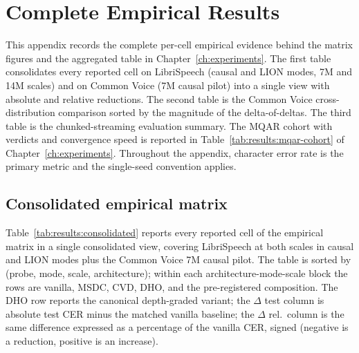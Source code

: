 \chapter{Complete Empirical Results}\label{app:results}

This appendix records the complete per-cell empirical evidence
behind the matrix figures and the aggregated table in
Chapter~\ref{ch:experiments}. The first table consolidates every
reported cell on LibriSpeech (causal and LION modes, 7M and 14M
scales) and on Common Voice (7M causal pilot) into a single view
with absolute and relative reductions. The second table is the
Common Voice cross-distribution comparison sorted by the
magnitude of the delta-of-deltas. The third table is the
chunked-streaming evaluation summary. The MQAR cohort with
verdicts and convergence speed is reported in
Table~\ref{tab:results:mqar-cohort} of
Chapter~\ref{ch:experiments}. Throughout the appendix, character
error rate is the primary metric and the single-seed convention
applies.

\section{Consolidated empirical matrix}\label{app:results:master}

Table~\ref{tab:results:consolidated} reports every reported cell
of the empirical matrix in a single consolidated view, covering
LibriSpeech at both scales in causal and LION modes plus the
Common Voice 7M causal pilot. The table is sorted by
(probe, mode, scale, architecture); within each
architecture-mode-scale block the rows are vanilla, MSDC, CVD,
DHO, and the pre-registered composition. The DHO row reports the
canonical depth-graded variant; the $\Delta$ test column is
absolute test CER minus the matched vanilla baseline; the
$\Delta$ rel.\ column is the same difference expressed as a
percentage of the vanilla CER, signed (negative is a reduction,
positive is an increase).

